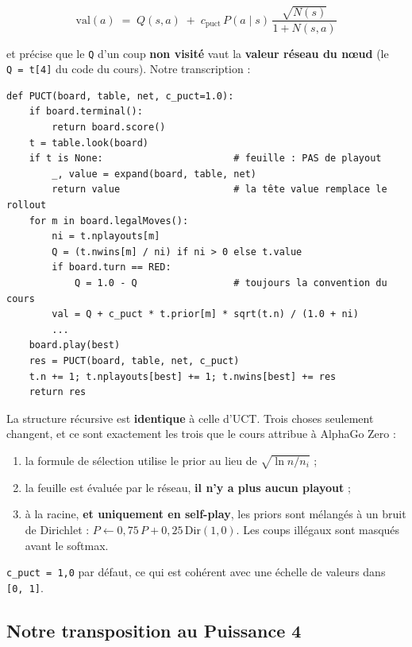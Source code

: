 \documentclass[11pt,a4paper]{article}
\begin{document}
\begin{equation*}
\mathrm{val}(a) \;=\; Q(s,a) \;+\; c_{\mathrm{puct}}\,P(a \mid s)\,
\frac{\sqrt{N(s)}}{1 + N(s,a)}
\end{equation*}

et précise que le \texttt{Q} d'un coup \textbf{non visité} vaut la \textbf{valeur réseau du nœud}
(le \texttt{Q\ =\ t{[}4{]}} du code du cours). Notre transcription :

\begin{lstlisting}[caption={PUCT : la même récursion, guidée par le réseau.},label={lst:puct}]
def PUCT(board, table, net, c_puct=1.0):
    if board.terminal():
        return board.score()
    t = table.look(board)
    if t is None:                       # feuille : PAS de playout
        _, value = expand(board, table, net)
        return value                    # la tête value remplace le rollout
    for m in board.legalMoves():
        ni = t.nplayouts[m]
        Q = (t.nwins[m] / ni) if ni > 0 else t.value
        if board.turn == RED:
            Q = 1.0 - Q                 # toujours la convention du cours
        val = Q + c_puct * t.prior[m] * sqrt(t.n) / (1.0 + ni)
        ...
    board.play(best)
    res = PUCT(board, table, net, c_puct)
    t.n += 1; t.nplayouts[best] += 1; t.nwins[best] += res
    return res
\end{lstlisting}

La structure récursive est \textbf{identique} à celle d'UCT. Trois choses seulement
changent, et ce sont exactement les trois que le cours attribue à AlphaGo Zero :

\begin{enumerate}
\def\labelenumi{\arabic{enumi}.}
\setlength{\itemsep}{1pt}\setlength{\parskip}{0pt}
\item
  la formule de sélection utilise le prior au lieu de $\sqrt{\ln n / n_i}$ ;
\item
  la feuille est évaluée par le réseau, \textbf{il n'y a plus aucun playout} ;
\item
  à la racine, \textbf{et uniquement en self-play}, les priors sont mélangés à un
  bruit de Dirichlet : $P \leftarrow 0{,}75\,P + 0{,}25\,\mathrm{Dir}(1{,}0)$.
  Les coups illégaux sont masqués avant le softmax.
\end{enumerate}

\texttt{c\_puct\ =\ 1,0} par défaut, ce qui est cohérent avec une échelle de valeurs dans
\texttt{{[}0,\ 1{]}}.

\subsection{Notre transposition au Puissance 4}\label{notre-transposition-au-puissance-4}
\end{document}
